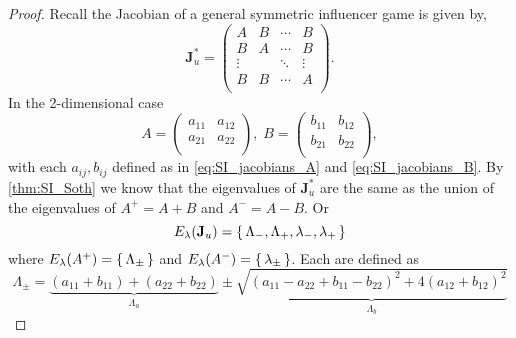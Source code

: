\documentclass{article}
\begin{document}
            \begin{proof}
                Recall the Jacobian of a general symmetric influencer game is given by,  
                \begin{equation}
                    \mathbf{J}_u^*=\begin{pmatrix}
                        A & B& \cdots & B \\ %
                        B & A & \cdots & B \\ %
                        \vdots &  & \ddots &\vdots  \\ %
                        B& B & \cdots & A \\ %
                        \end{pmatrix}.
                \end{equation}
                In the 2-dimensional case 
                \begin{equation}
                    A=\begin{pmatrix}
                        a_{11} & a_{12} \\ %
                        a_{21} & a_{22} \\ %
                        \end{pmatrix}, \;
                    B=\begin{pmatrix}
                        b_{11} & b_{12} \\ %
                        b_{21} & b_{22} \\ %
                        \end{pmatrix},   
                \end{equation}
                with each $a_{ij},b_{ij}$ defined as in \cref{eq:SI_jacobians_A} and \cref{eq:SI_jacobians_B}. By \cref{thm:SI_Soth} we know that the eigenvalues of $\mathbf{J}_u^*$ are the same as the union of the eigenvalues of $A^+=A+B$ and $A^-=A-B$. Or
                \begin{equation}
                    E_\lambda(\mathbf{J}_u)=\set{\Lambda_-,\Lambda_+,\lambda_-,\lambda_+}
                \end{equation}
                where $E_\lambda(A^+)=\set{\Lambda_{\pm}}$ and $E_\lambda(A^-)=\set{\lambda_\pm}$. Each are defined as 
                \begin{equation}
                    \Lambda_{\pm}=\underset{\Lambda_a}{\underbrace{(a_{11}+b_{11})+(a_{22}+b_{22})}}\pm \underset{\Lambda_b}{\underbrace{\sqrt{(a_{11}-a_{22}+b_{11}-b_{22})^2+4(a_{12}+b_{12})^2}}}
                \end{equation}

\end{proof}
\end{document}
